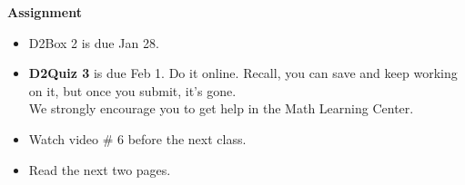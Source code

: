 \noindent
{\bf Assignment}\vspace{-.5cm}
\begin{itemize}
\item  D2Box 2 is due Jan 28.
\item {\bf D2Quiz 3} is due Feb 1. Do it online. Recall, you can
  save and keep working on it, but once you submit, it's gone.\\
  We strongly encourage you to get help in the Math Learning Center.
\item Watch video \# 6 before the next class.
\item Read the next two pages.
\end{itemize}






